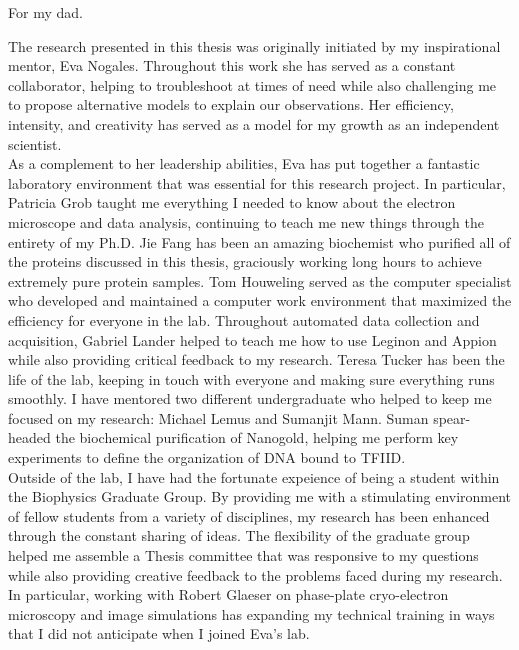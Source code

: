 \documentclass{ucbthesis}
\begin{document}
\begin{frontmatter}

\begin{dedication}
\null\vfil
\begin{center}
For my dad.
\end{center}
\vfil\null
\end{dedication}

\tableofcontents
\clearpage
\listoffigures
\clearpage


\begin{acknowledgements}
The research presented in this thesis was originally initiated by my inspirational mentor, Eva Nogales. Throughout this work she has served as a constant collaborator, helping to troubleshoot at times of need while also challenging me to propose alternative models to explain our observations. Her efficiency, intensity, and creativity has served as a model for my growth as an independent scientist.\\
\indent As a complement to her leadership abilities, Eva has put together a fantastic laboratory environment that was essential for this research project. In particular, Patricia Grob taught me everything I needed to know about the electron microscope and data analysis, continuing to teach me new things through the entirety of my Ph.D. Jie Fang has been an amazing biochemist who purified all of the proteins discussed in this thesis, graciously working long hours to achieve extremely pure protein samples. Tom Houweling served as the computer specialist who developed and maintained a computer work environment that maximized the efficiency for everyone in the lab. Throughout automated data collection and acquisition, Gabriel Lander helped to teach me how to use Leginon and Appion while also providing critical feedback to my research. Teresa Tucker has been the life of the lab, keeping in touch with everyone and making sure everything runs smoothly. I have mentored two different undergraduate who helped to keep me focused on my research: Michael Lemus and Sumanjit Mann. Suman spear-headed the biochemical purification of Nanogold, helping me perform key experiments to define the organization of DNA bound to TFIID.\\
\indent Outside of the lab, I have had the fortunate expeience of being a student within the Biophysics Graduate Group. By providing me with a stimulating environment of fellow students from a variety of disciplines, my research has been enhanced through the constant sharing of ideas. The flexibility of the graduate group helped me assemble a Thesis committee that was responsive to my questions while also providing creative feedback to the problems faced during my research. In particular, working with Robert Glaeser on phase-plate cryo-electron microscopy and image simulations has expanding my technical training in ways that I did not anticipate when I joined Eva's lab.\\

\end{acknowledgements}
\end{frontmatter}
\end{document}
